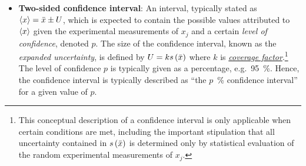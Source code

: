 \begin{itemize}
%


\item {\bf Two-sided confidence interval}: An interval, typically stated as $\langle x \rangle = \bar{x} \pm U$, which is expected to contain the possible values attributed to $\langle x \rangle$ given the experimental measurements of $x_j$ and a certain {\it level of confidence}, denoted $p$.
  The size of the confidence interval, known as the {\it expanded uncertainty}, is defined by $U = k s\left( \bar{x} \right)$ where $k$ is \hyperref[def:coveragefactor]{\it coverage factor}\cite{JCGM:VIM2012}.\footnote{This conceptual description of a confidence interval is only applicable when certain conditions are met, including the important stipulation that all uncertainty contained in $s\left( \bar{x} \right)$ is determined only by statistical evaluation of the random experimental measurements of $x_j$\cite{JCGM:GUM2008}.}
  The level of confidence $p$ is typically given as a percentage, e.g.~95~\%. Hence, the confidence interval is typically described as ``the $p$~\% confidence interval'' for a given value of $p$.
  \label{def:conf_int}


\end{itemize}
